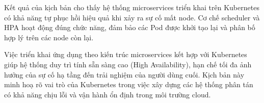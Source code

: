 Kết quả của kịch bản cho thấy hệ thống microservices triển khai trên Kubernetes có
khả năng tự phục hồi hiệu quả khi xảy ra sự cố mất node. Cơ chế scheduler và HPA
hoạt động đúng chức năng, đảm bảo các Pod được khởi tạo lại và phân bố hợp lý trên
các node còn lại.

Việc triển khai ứng dụng theo kiến trúc microservices kết hợp với Kubernetes giúp
hệ thống duy trì tính sẵn sàng cao (High Availability), hạn chế tối đa ảnh hưởng
của sự cố hạ tầng đến trải nghiệm của người dùng cuối. Kịch bản này minh hoạ rõ
vai trò của Kubernetes trong việc xây dựng các hệ thống phân tán có khả năng chịu
lỗi và vận hành ổn định trong môi trường cloud.

